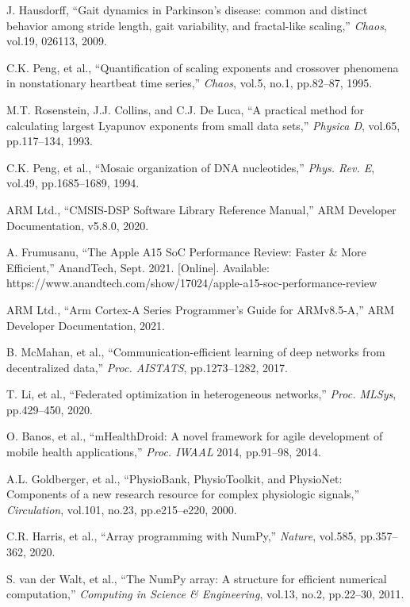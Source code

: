 \documentclass[paper]{ieicej}
\begin{document}
\begin{thebibliography}{99}
J. Hausdorff, ``Gait dynamics in Parkinson's disease: common and distinct behavior among stride length, gait variability, and fractal-like scaling,'' \textit{Chaos}, vol.19, 026113, 2009.

C.K. Peng, et al., ``Quantification of scaling exponents and crossover phenomena in nonstationary heartbeat time series,'' \textit{Chaos}, vol.5, no.1, pp.82--87, 1995.

M.T. Rosenstein, J.J. Collins, and C.J. De Luca, ``A practical method for calculating largest Lyapunov exponents from small data sets,'' \textit{Physica D}, vol.65, pp.117--134, 1993.

C.K. Peng, et al., ``Mosaic organization of DNA nucleotides,'' \textit{Phys. Rev. E}, vol.49, pp.1685--1689, 1994.

ARM Ltd., ``CMSIS-DSP Software Library Reference Manual,'' ARM Developer Documentation, v5.8.0, 2020.

A. Frumusanu, ``The Apple A15 SoC Performance Review: Faster & More Efficient,'' AnandTech, Sept. 2021. [Online]. Available: https://www.anandtech.com/show/17024/apple-a15-soc-performance-review

ARM Ltd., ``Arm Cortex-A Series Programmer's Guide for ARMv8.5-A,'' ARM Developer Documentation, 2021.

B. McMahan, et al., ``Communication-efficient learning of deep networks from decentralized data,'' \textit{Proc. AISTATS}, pp.1273--1282, 2017.

T. Li, et al., ``Federated optimization in heterogeneous networks,'' \textit{Proc. MLSys}, pp.429--450, 2020.

O. Banos, et al., ``mHealthDroid: A novel framework for agile development of mobile health applications,'' \textit{Proc. IWAAL} 2014, pp.91--98, 2014.

A.L. Goldberger, et al., ``PhysioBank, PhysioToolkit, and PhysioNet: Components of a new research resource for complex physiologic signals,'' \textit{Circulation}, vol.101, no.23, pp.e215--e220, 2000.

C.R. Harris, et al., ``Array programming with NumPy,'' \textit{Nature}, vol.585, pp.357--362, 2020.

S. van der Walt, et al., ``The NumPy array: A structure for efficient numerical computation,'' \textit{Computing in Science \& Engineering}, vol.13, no.2, pp.22--30, 2011.

\end{thebibliography}
\end{document}
